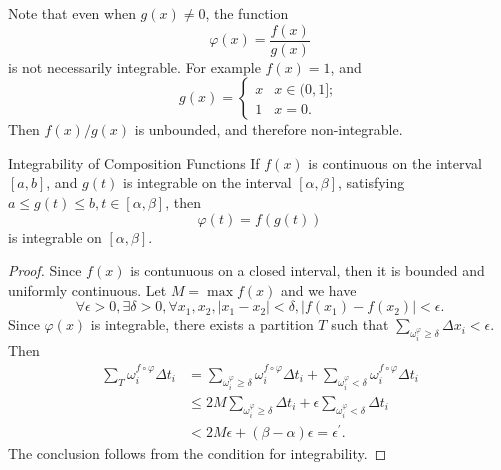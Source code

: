 \begin{note}
  Note that even when $g(x) \neq 0$, the function
  \begin{equation}
    \varphi(x) = \frac{f(x)}{g(x)}
  \end{equation}
  is not necessarily integrable.
  For example $f(x) = 1$, and
  \begin{equation}
    g(x) =
    \begin{cases}
      x & x \in (0, 1];\\
      1 & x = 0.
    \end{cases}
  \end{equation}
  Then $f(x)/g(x)$ is unbounded, and therefore non-integrable.
\end{note}

\begin{proposition}{Integrability of Composition Functions}{}
  If $f(x)$ is continuous on the interval $[a, b]$,
  and $g(t)$ is integrable on the interval $[\alpha, \beta]$,
  satisfying $a \leq g(t) \leq b, t \in [\alpha, \beta]$,
  then
  \begin{equation}
    \varphi(t) = f(g(t))
  \end{equation}
  is integrable on $[\alpha, \beta]$.
\end{proposition}

\begin{proof}
  Since $f(x)$ is contunuous on a closed interval, then it is bounded and
  uniformly continuous. Let $M = \max f(x)$ and we have
  \begin{equation}
    \forall \epsilon > 0, \exists \delta > 0, \forall x_1, x_2, |x_1 - x_2| < \delta,
    |f(x_1) - f(x_2)| < \epsilon.
  \end{equation}
  Since $\varphi(x)$ is integrable, there exists a partition $T$ such that
  $\sum \limits_{\omega_i^{\varphi} \geq \delta} \Delta x_i < \epsilon$.
  Then
  \begin{align}
    \sum\limits_T \omega_i^{f \circ \varphi} \Delta t_i &= \sum\limits_{\omega_i^{\varphi} \geq \delta} \omega_i^{f \circ \varphi} \Delta t_i + \sum\limits_{\omega_i^{\varphi} < \delta} \omega_i^{f \circ \varphi} \Delta t_i\\
    &\leq 2M \sum\limits_{\omega_i^{\varphi} \geq \delta} \Delta t_i + \epsilon \sum\limits_{\omega_i^{\varphi} < \delta} \Delta t_i\\
    &< 2M \epsilon + (\beta - \alpha)\epsilon = \epsilon^{\prime}.
  \end{align}
  The conclusion follows from the condition for integrability.
\end{proof}

